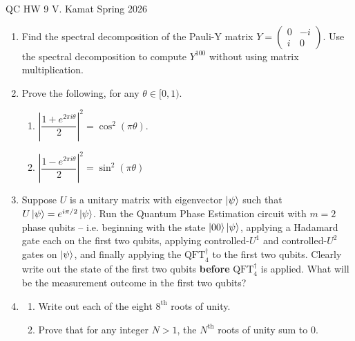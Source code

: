 \documentclass[12pt]{article}
\begin{document}
	
\centerline{QC HW 9
	\hspace{0.4 in}V. Kamat
	\hspace{0.4 in}Spring 2026}

\begin{enumerate}
\item Find the spectral decomposition of the Pauli-Y matrix $Y = \begin{pmatrix} 0 & -i \\ i & 0 \end{pmatrix}$. Use the spectral decomposition to compute $Y^{100}$ without using matrix multiplication.
\item Prove the following, for any $\theta\in [0,1)$.
\begin{enumerate}
    \item $\left|\dfrac{1+e^{2\pi i\theta}}{2}\right|^2=\cos^2(\pi\theta)$.
    \item $\left|\dfrac{1-e^{2\pi i\theta}}{2}\right|^2=\sin^2(\pi\theta)$
\end{enumerate} 
\item Suppose $U$ is a unitary matrix with eigenvector $\ket{\psi}$ such that $U\ket{\psi}=e^{i\pi/2}\ket{\psi}$. Run the Quantum Phase Estimation circuit with $m=2$ phase qubits -- i.e. beginning with the state $\ket{00}\ket{\psi}$, applying a Hadamard gate each on the first two qubits, applying controlled-$U^1$ and controlled-$U^2$ gates on $\ket{\psi}$, and finally applying the $\text{QFT}^{\dagger}_4$ to the first two qubits. Clearly write out the state of the first two qubits \textbf{before} $\text{QFT}^{\dagger}_4$ is applied. What will be the measurement outcome in the first two qubits? 
\item 
\begin{enumerate}
    \item Write out each of the eight $8^{\text{th}}$ roots of unity. 
    \item Prove that for any integer $N>1$, the $N^{\text{th}}$ roots of unity sum to $0$.
\end{enumerate}
\end{enumerate}
\end{document}
